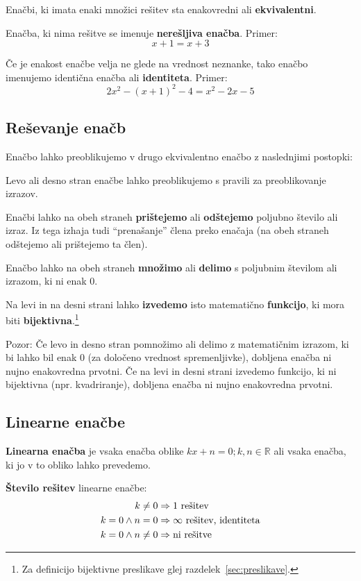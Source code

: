 \documentclass[a4paper,oneside,12pt,fleqn]{article}
\def\R{\ensuremath{\mathbb R}}
\renewcommand\implies\Rightarrow
\numberwithin{equation}{section}
\newenvironment{itemize*}%
{
\vspace{-12pt}%
\begin{itemize}%
\setlength{\itemsep}{0pt}%
\setlength{\parskip}{2pt}}%
{\end{itemize}}
\begin{document}
Enačbi, ki imata enaki množici rešitev sta enakovredni ali \textbf{ekvivalentni}.

Enačba, ki nima rešitve se imenuje \textbf{nerešljiva enačba}. Primer:
\[ x + 1 = x + 3 \]

Če je enakost enačbe velja ne glede na vrednost neznanke, tako enačbo imenujemo identična
enačba ali \textbf{identiteta}. Primer:
\[2x^2 -(x + 1)^2 - 4 = x^2 - 2x - 5 \]

\subsection{Reševanje enačb}
\label{sec:enac:resev}
Enačbo lahko preoblikujemo v drugo ekvivalentno enačbo z naslednjimi postopki:
\begin{itemize*}
  \item Levo ali desno stran enačbe lahko preoblikujemo s pravili za preoblikovanje
    izrazov.
  \item Enačbi lahko na obeh straneh \textbf{prištejemo} ali \textbf{odštejemo} poljubno število
ali izraz. Iz tega izhaja tudi ``prenašanje'' člena preko enačaja (na obeh straneh odštejemo ali
prištejemo ta člen).

  \item Enačbo lahko na obeh straneh \textbf{množimo} ali \textbf{delimo} s poljubnim številom ali izrazom, ki ni
enak 0. 

  \item Na levi in na desni strani lahko \textbf{izvedemo} isto matematično \textbf{funkcijo}, ki mora biti
\textbf{bijektivna}.\footnote{Za definicijo bijektivne preslikave glej
razdelek~\ref{sec:preslikave}.}
\end{itemize*}

Pozor: Če levo in desno stran pomnožimo ali delimo z matematičnim izrazom, ki bi lahko bil
enak 0 (za določeno vrednost spremenljivke), dobljena enačba ni nujno enakovredna prvotni.
Če na levi in desni strani izvedemo funkcijo, ki ni bijektivna (npr. kvadriranje),
dobljena enačba ni nujno enakovredna prvotni.

\subsection{Linearne enačbe}
\label{sec:enac:lin}
\textbf{Linearna enačba} je vsaka enačba oblike $kx + n = 0; k, n \in \R$ ali vsaka enačba, ki jo v to
obliko lahko prevedemo.

\textbf{Število rešitev} linearne enačbe:
\begin{align*}
  k \neq 0 &\implies \textnormal{1 rešitev} \\
  k = 0 \land n = 0 &\implies \infty \textnormal{ rešitev, identiteta} \\
  k = 0 \land n \neq 0 &\implies \textnormal{ni rešitve}
\end{align*}
\end{document}

